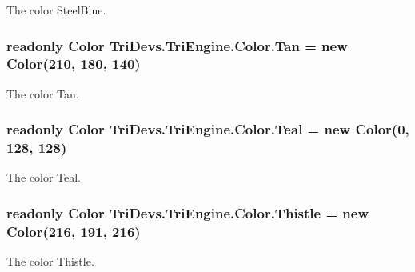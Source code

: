 The color Steel\-Blue. 

\hypertarget{struct_tri_devs_1_1_tri_engine_1_1_color_a4ec23dfe2d574bfe91ea6f4f1fe00bab}{
\subsubsection[{Tan}]{\setlength{\rightskip}{0pt plus 5cm}readonly {\bf Color} Tri\-Devs.\-Tri\-Engine.\-Color.\-Tan = new {\bf Color}(210, 180, 140)\hspace{0.3cm}{\ttfamily [static]}}}\label{struct_tri_devs_1_1_tri_engine_1_1_color_a4ec23dfe2d574bfe91ea6f4f1fe00bab}


The color Tan. 

\hypertarget{struct_tri_devs_1_1_tri_engine_1_1_color_a20875bda1e6d890219d551fb2ac8b16d}{
\subsubsection[{Teal}]{\setlength{\rightskip}{0pt plus 5cm}readonly {\bf Color} Tri\-Devs.\-Tri\-Engine.\-Color.\-Teal = new {\bf Color}(0, 128, 128)\hspace{0.3cm}{\ttfamily [static]}}}\label{struct_tri_devs_1_1_tri_engine_1_1_color_a20875bda1e6d890219d551fb2ac8b16d}


The color Teal. 

\hypertarget{struct_tri_devs_1_1_tri_engine_1_1_color_ab97fe25803404918c876683856c11983}{
\subsubsection[{Thistle}]{\setlength{\rightskip}{0pt plus 5cm}readonly {\bf Color} Tri\-Devs.\-Tri\-Engine.\-Color.\-Thistle = new {\bf Color}(216, 191, 216)\hspace{0.3cm}{\ttfamily [static]}}}\label{struct_tri_devs_1_1_tri_engine_1_1_color_ab97fe25803404918c876683856c11983}


The color Thistle. 

